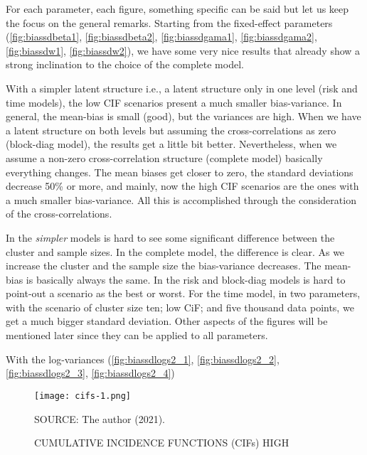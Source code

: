 For each parameter, each figure, something specific can be said but let
us keep the focus on the general remarks. Starting from the fixed-effect
parameters (\autoref{fig:biassdbeta1}, \autoref{fig:biassdbeta2},
\autoref{fig:biassdgama1}, \autoref{fig:biassdgama2},
\autoref{fig:biassdw1}, \autoref{fig:biassdw2}), we have some very nice
results that already show a strong inclination to the choice of the
complete model.

With a simpler latent structure i.e., a latent structure only in one
level (risk and time models), the low CIF scenarios present a much
smaller bias-variance. In general, the mean-bias is small (good), but
the variances are high. When we have a latent structure on both levels
but assuming the cross-correlations as zero (block-diag model), the
results get a little bit better. Nevertheless, when we assume a non-zero
cross-correlation structure (complete model) basically everything
changes. The mean biases get closer to zero, the standard deviations
decrease 50\% or more, and mainly, now the high CIF scenarios are the
ones with a much smaller bias-variance. All this is accomplished through
the consideration of the cross-correlations.

In the \textit{simpler} models is hard to see some significant
difference between the cluster and sample sizes. In the complete model,
the difference is clear. As we increase the cluster and the sample size
the bias-variance decreases. The mean-bias is basically always the
same. In the risk and block-diag models is hard to point-out a scenario
as the best or worst. For the time model, in two parameters, with the
scenario of cluster size ten; low CiF; and five thousand data points, we
get a much bigger standard deviation. Other aspects of the figures will
be mentioned later since they can be applied to all parameters.

With the log-variances (\autoref{fig:biassdlogs2_1},
\autoref{fig:biassdlogs2_2}, \autoref{fig:biassdlogs2_3},
\autoref{fig:biassdlogs2_4})

\begin{figure}[H]
 \setlength{\abovecaptionskip}{.0001pt}
 \caption{CUMULATIVE INCIDENCE FUNCTIONS (CIFs) HIGH}
 \vspace{0.2cm}\centering
 \texttt{[image: cifs-1.png]}\\
 \begin{footnotesize}
  SOURCE: The author (2021).
 \end{footnotesize}
 \label{fig:cifshigh}
\end{figure}

